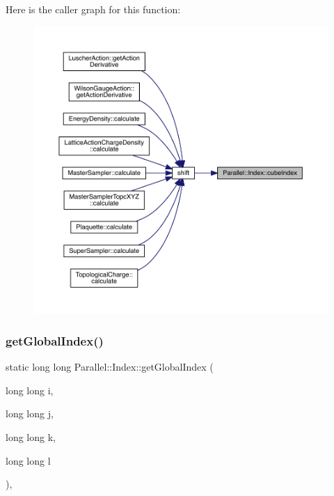 Here is the caller graph for this function\+:
\nopagebreak
\begin{figure}[H]
\begin{center}
\leavevmode
\includegraphics[width=350pt]{class_parallel_1_1_index_ac406d7ceb12e986a66d64ef98fcef5d3_icgraph}
\end{center}
\end{figure}
\mbox{\label{class_parallel_1_1_index_aaa2650024b4e91dc86d2bdc568c8f57d}} 
\subsubsection{\texorpdfstring{getGlobalIndex()}{getGlobalIndex()}}
{\footnotesize\ttfamily static long long Parallel\+::\+Index\+::get\+Global\+Index (\begin{DoxyParamCaption}\item[{long long}]{i,  }\item[{long long}]{j,  }\item[{long long}]{k,  }\item[{long long}]{l }\end{DoxyParamCaption})\hspace{0.3cm}{\ttfamily [inline]}, {\ttfamily [static]}}


